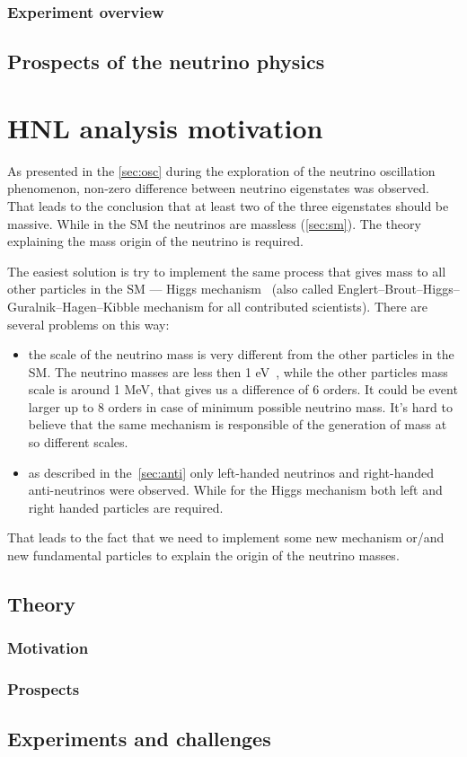 \documentclass[../main.tex]{subfiles}
\begin{document}
\subsection{Experiment overview}
\label{sec:exp}



\section{Prospects of the neutrino physics}





\chapter{HNL analysis motivation}
\label{ch:intro:HNL}

As presented in the \autoref{sec:osc} during the exploration of the neutrino oscillation phenomenon, non-zero difference between neutrino eigenstates was observed. That leads to the conclusion that at least two of the three eigenstates should be massive. While in the SM the neutrinos are massless (\autoref{sec:sm}). The theory explaining the mass origin of the neutrino is required.

The easiest solution is try to implement the same process that gives mass to all other particles in the SM --- Higgs mechanism~\cite{Higgs1964} (also called Englert–Brout–Higgs–Guralnik–Hagen–Kibble mechanism for all contributed scientists). There are several problems on this way:
\begin{itemize}
  \item the scale of the neutrino mass is very different from the other particles in the SM. The neutrino masses are less then 1 eV~\cite{Aker2019}, while the other particles mass scale is around 1 MeV, that gives us a difference of 6 orders. It could be event larger up to 8 orders in case of minimum possible neutrino mass. It's hard to believe that the same mechanism is responsible of the generation of mass at so different scales.
  \item as described in the~\autoref{sec:anti} only left-handed neutrinos and right-handed anti-neutrinos were observed. While for the Higgs mechanism both left and right handed particles are required.
\end{itemize}

That leads to the fact that we need to implement some new mechanism or/and new fundamental particles to explain the origin of the neutrino masses.



\section{Theory}

\subsection{Motivation}

\subsection{Prospects}


\section{Experiments and challenges}
\end{document}
